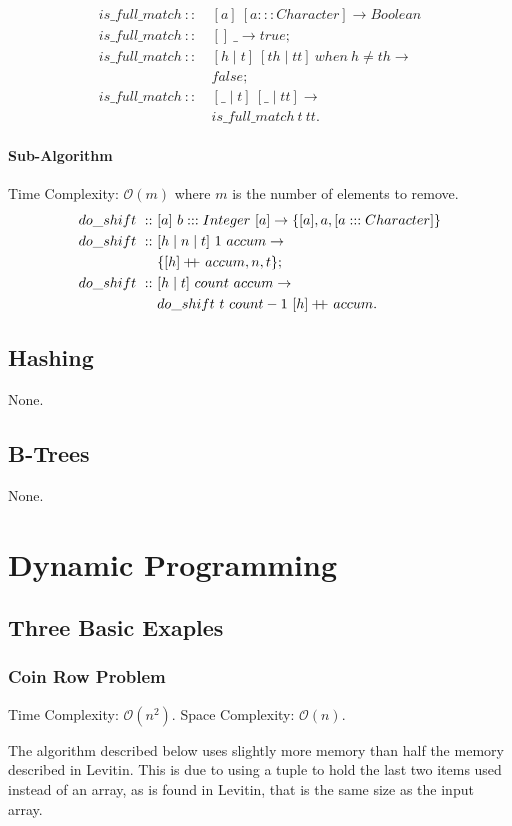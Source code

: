 \documentclass[a4paper,10pt]{book}
\newcommand\when{\  when\ }
\newcommand\doubleplus{+\kern-1.3ex+\kern0.8ex}
\begin{document}
\begin{align*}
is\_full\_match\ ::\ & [a]\ [a:::Character]\rightarrow Boolean\\
is\_full\_match\ ::\ & []\ \_\rightarrow true;\\
is\_full\_match\ ::\ &[h\mid t]\ [th\mid tt]\when h\ne th\rightarrow\\
	&false;\\
is\_full\_match\ ::\ &[\_\mid t]\ [\_\mid tt]\rightarrow\\
	&is\_full\_match\ t\ tt.
\end{align*}
\subsubsection{Sub-Algorithm}Time Complexity: $\mathcal{O}(m)$ where $m$ is the number of elements to remove.
\begin{align*}
do\_shift\ ::\ &[a]\ b:::Integer\ [a]\rightarrow\{[a],a,[a:::Character]\}\\
do\_shift\ ::\ &[h\mid n\mid t]\ 1\ accum\rightarrow\\
	&\{[h]\doubleplus accum,n,t\};\\
do\_shift\ ::\ &[h\mid t]\ count\ accum\rightarrow\\
	&do\_shift\ t\ count-1\ [h]\doubleplus accum.
\end{align*}

\section{Hashing}
None.
\section{B-Trees}
None.
\chapter{Dynamic Programming}
\section{Three Basic Exaples}
\subsection{Coin Row Problem}

Time Complexity: $\mathcal{O}(n^2)$. Space Complexity: $\mathcal{O}(n)$.

The algorithm described below uses slightly more memory than half the memory described in Levitin. This is due to using a tuple to hold the last two items used instead of an array, as is found in Levitin, that is the same size as the input array. 
\end{document}
